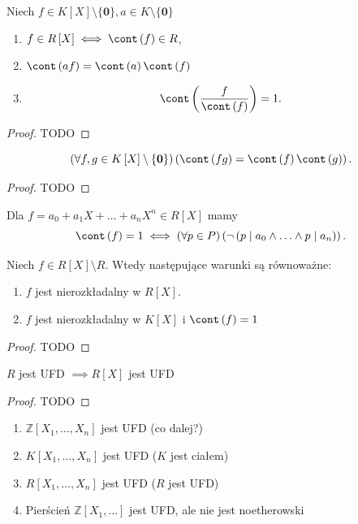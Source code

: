 \begin{lemma}
	Niech $f\in K\left[ X \right] \setminus \{\mathbf{0}\}, a \in K\setminus \{\mathbf{0}\}  $
	\begin{enumerate}[label=\arabic*)]
		\item $f \in R\left[ X \right] \iff \cont \left( f \right) \in R$,
		\item $\cont \left( af \right) = \cont \left( a \right) \cont \left( f \right) $
		\item \[
		\cont \left( \frac{f}{\cont \left( f \right) } \right) = 1
		.\] 
	\end{enumerate}
\end{lemma} 
\begin{proof}
	TODO
\end{proof} 
\begin{lemma}[Guassa?]
	\[
	\left(\forall f,g \in K\left[ X \right] \setminus \{\mathbf{0}\}  \right)\left( \cont \left( fg \right) = \cont \left( f \right) \cont \left( g \right)  \right)  
	.\] 
\end{lemma} 
\begin{proof}
	TODO
\end{proof} 
\begin{remark}
	Dla $f = a_0 + a_1X + \ldots + a_{n} X^{n} \in R\left[ X \right] $ mamy
	\[
	\cont \left( f \right) = 1 \iff \left(\forall p\in P \right)\left( \neg \left( p\mid a_0 \land\ldots\land p\mid a_{n}  \right)  \right)  
	.\] 
\end{remark} 
\begin{corollary}
      Niech $f\in R\left[ X \right] \setminus R$. Wtedy następujące warunki są równoważne:
      \begin{enumerate}[label=\arabic*)]
      	\item $f$ jest nierozkładalny w $R\left[ X \right] $.
	\item $f$ jest nierozkładalny w $K\left[ X \right] $ i $\cont \left( f \right) = 1$
      \end{enumerate}
\end{corollary}
\begin{proof}
	TODO
\end{proof} 
\begin{theorem}[Gaussa]
	$R$ jest UFD $\implies R\left[ X \right] $ jest UFD
\end{theorem} 
\begin{proof}
	TODO
\end{proof} 
\begin{corollary}
\begin{enumerate}[label=\arabic*)]
	\item $\mathbb{Z} \left[ X_1,\ldots,X_{n}  \right] $ jest UFD (co dalej?)
	\item $K\left[ X_1,\ldots,X_{n}  \right] $ jest UFD ($K$ jest ciałem)
	\item $R\left[ X_1,\ldots,X_{n}  \right] $ jest UFD ($R$ jest UFD)
	\item Pierścień $\mathbb{Z} \left[ X_1,\ldots \right] $ jest UFD, ale nie jest noetherowski
\end{enumerate}	
\end{corollary}
